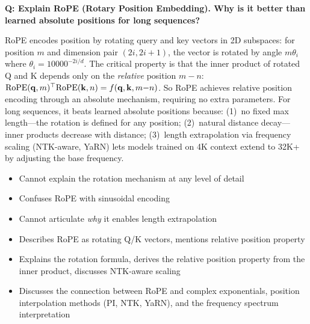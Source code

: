\bigskip

\begin{interviewq}
\textbf{Q: Explain RoPE (Rotary Position Embedding). Why is it better than
learned absolute positions for long sequences?}

 \quad {} \quad \badgefreq{\freqmed}

\stronganswer
RoPE encodes position by rotating query and key vectors in 2D subspaces: for
position $m$ and dimension pair $(2i, 2i{+}1)$, the vector is rotated by angle
$m\theta_i$ where $\theta_i = 10000^{-2i/d}$.  The critical property is that
the inner product of rotated Q and K depends only on the \emph{relative}
position $m - n$: $\text{RoPE}(\mathbf{q}, m)^\top \text{RoPE}(\mathbf{k}, n) = f(\mathbf{q}, \mathbf{k}, m{-}n)$.
So RoPE achieves relative position encoding through an absolute mechanism,
requiring no extra parameters.  For long sequences, it beats learned absolute
positions because: (1)~no fixed max length---the rotation is defined for any
position; (2)~natural distance decay---inner products decrease with distance;
(3)~length extrapolation via frequency scaling (NTK-aware, YaRN) lets models
trained on 4K context extend to 32K+ by adjusting the base frequency.

\redflags
\begin{itemize}
    \item Cannot explain the rotation mechanism at any level of detail
    \item Confuses RoPE with sinusoidal encoding
    \item Cannot articulate \emph{why} it enables length extrapolation
\end{itemize}


\goodgreat
\begin{itemize}
    \item {} Describes RoPE as rotating Q/K vectors, mentions relative
          position property
    \item {} Explains the rotation formula, derives the relative position
          property from the inner product, discusses NTK-aware scaling
    \item {} Discusses the connection between RoPE and complex
          exponentials, position interpolation methods (PI, NTK, YaRN), and the
          frequency spectrum interpretation
\end{itemize}

\end{interviewq}

